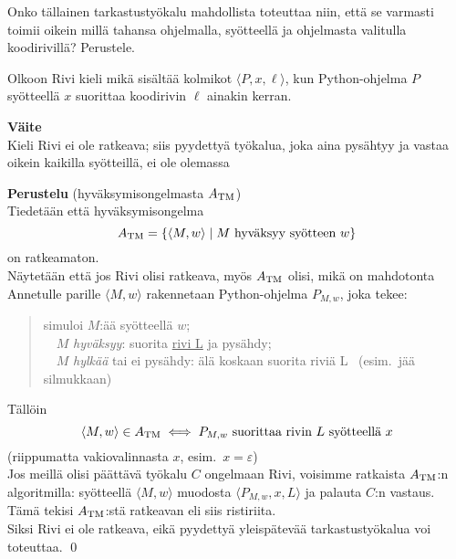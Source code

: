 \documentclass[12pt,a4paper]{article}
\begin{document}
Onko tällainen tarkastustyökalu mahdollista toteuttaa niin,
että se varmasti toimii oikein millä tahansa ohjelmalla,
syötteellä ja ohjelmasta valitulla koodirivillä?
Perustele.\\



\bigskip

Olkoon {\sc Rivi} kieli mikä sisältää kolmikot $\langle P,x,\ell\rangle$,
kun Python-ohjelma $P$ syötteellä $x$ suorittaa koodirivin $\ell$ ainakin kerran.

\bigskip
\noindent\textbf{Väite} \\
Kieli {\sc Rivi} ei ole ratkeava; siis pyydettyä työkalua,
joka aina pysähtyy ja vastaa oikein kaikilla syötteillä, ei ole olemassa

\bigskip
\noindent\textbf{Perustelu} (hyväksymisongelmasta $A_{\rm TM}$)\\
Tiedetään että hyväksymisongelma
\[
A_{\rm TM}=\{\langle M,w\rangle \mid \text{$M$ hyväksyy syötteen $w$}\}
\]
on ratkeamaton.\\

Näytetään että jos {\sc Rivi} olisi ratkeava, myös $A_{\rm TM}$ olisi,
mikä on mahdotonta\\

Annetulle parille $\langle M,w\rangle$ rakennetaan Python-ohjelma $P_{M,w}$,
joka tekee:

\begin{quote}\ttfamily
simuloi $M$:ää syötteellä $w$;\\
\ \ $M$ \emph{hyväksyy}: suorita \underline{rivi L} ja pysähdy;\\
\ \ $M$ \emph{hylkää} tai ei pysähdy: älä koskaan suorita riviä L
\ (esim.\ jää silmukkaan)
\end{quote}

Tällöin
\[
\langle M,w\rangle\in A_{\rm TM}
\iff
\text{$P_{M,w}$ suorittaa rivin $L$ syötteellä $x$}
\]
(riippumatta vakiovalinnasta $x$, esim.\ $x=\varepsilon$)\\


Jos meillä olisi päät­tävä työkalu $C$ ongelmaan {\sc Rivi}, voisimme ratkaista
$A_{\rm TM}$:n algoritmilla: syötteellä $\langle M,w\rangle$ muodosta
$\langle P_{M,w},x,L\rangle$ ja palauta $C$:n vastaus. Tämä tekisi
$A_{\rm TM}$:stä ratkeavan eli siis ristiriita.\\

Siksi {\sc Rivi} ei ole ratkeava, eikä pyydettyä yleispätevää tarkastustyökalua
voi toteuttaa. \qed
\end{document}
